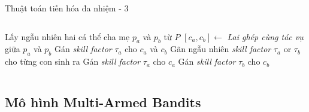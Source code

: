 \begin{frame}{Thuật toán tiến hóa đa nhiệm - 3}
\begin{columns}
\begin{column}{0.45\textwidth}
\begin{algorithm}[H]
                \begin{algorithmic}[1]
                    \State Lấy ngẫu nhiên hai cá thể cha mẹ $p_a$ và $p_b$ từ $P$
                        \State $[c_a, c_b] \leftarrow$ \emph{Lai ghép cùng tác vụ} giữa $p_a$ và $p_b$
                        \State Gán \emph{skill factor} $\tau_a$ cho $c_a$ và $c_b$
                        \State Gãn ngẫu nhiên \emph{skill factor} $\tau_a$ or $\tau_b$ cho từng con sinh ra
                    \Else
                        \State Gán \emph{skill factor} $\tau_a$ cho $c_a$ 
                        \State Gán \emph{skill factor} $\tau_b$ cho $c_b$
                    \EndIf
                \end{algorithmic}
                \label{alg:preliminary:mfea}
            \end{algorithm}
        \end{column}
    \end{columns}
\end{frame}

\subsection{Mô hình Multi-Armed Bandits}

